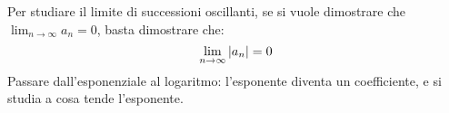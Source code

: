 Per studiare il limite di successioni oscillanti, se si vuole dimostrare che $\lim_{n \to \infty} a_n = 0$, basta dimostrare che:
\[
\lim_{n \to \infty} \left\lvert{a_n}\right\rvert = 0
\]
Passare dall'esponenziale al logaritmo: l'esponente diventa un coefficiente, e si studia a cosa tende l'esponente.


































